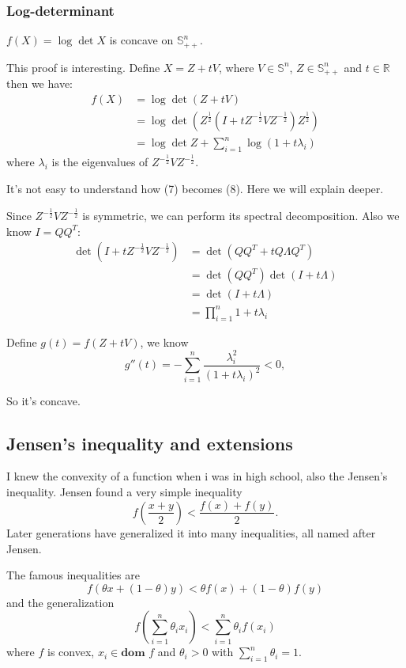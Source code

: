 \documentclass[lang=en,color=blue,mode=fancy,titlestyle=hang]{elegantbook}
\begin{document}
\subsubsection{Log-determinant} $f(X) = \log \det X$ is concave on $\mathbb{S}^n_{++}$.

This proof is interesting. Define $X = Z + tV$, where $V \in \mathbb{S}^n$,
$Z \in \mathbb{S}^n_{++}$ and $t \in \mathbb{R}$ then we have:
\begin{align}
f(X) &= \log \det (Z + tV) \\
&= \log \det (Z^{\frac12}(I + tZ^{-\frac12}VZ^{-\frac12})Z^{\frac12}) \\
&= \log \det Z + \sum_{i = 1}^{n} \log (1 + t \lambda_i)
\end{align}
where $\lambda_i$ is the eigenvalues of $Z^{-\frac12}VZ^{-\frac12}$.

It's not easy to understand how (7) becomes (8). Here we will explain deeper.

Since $Z^{-\frac12}VZ^{-\frac12}$ is symmetric, we can perform its spectral decomposition.
Also we know $I = QQ^T$:
\begin{align*}
\det (I + tZ^{-\frac12}VZ^{-\frac12}) &= \det (QQ^T + tQ \Lambda Q^T) \\
&= \det (QQ^T) \det (I + t\Lambda) \\
&= \det (I + t\Lambda) \\
&= \prod_{i = 1}^n 1 + t\lambda_i
\end{align*}

Define $g(t) = f(Z + tV)$, we know
\[
g''(t) = - \sum_{i = 1}^n \frac{\lambda_i^2}{(1 + t\lambda_i)^2} < 0,
\]

So it's concave.

\subsection{Jensen's inequality and extensions}

I knew the convexity of a function when i was in high school, also the Jensen's inequality.
Jensen found a very simple inequality
\[
f(\frac{x + y}{2}) < \frac{f(x) + f(y)}{2}.
\]
Later generations have generalized it into many inequalities, all named after Jensen.

The famous inequalities are
\[
f(\theta x + (1 - \theta) y) < \theta f(x) + (1 - \theta) f(y)
\]
and the generalization
\[
f(\sum_{i = 1}^n \theta_i x_i) < \sum_{i = 1}^n \theta_i f(x_i)
\]
where $f$ is convex, $x_i \in \textbf{dom } f$ and $\theta_i > 0$ with $\sum_{i = 1}^n \theta_i = 1$.
\end{document}
